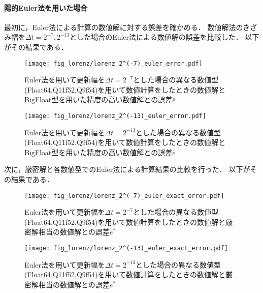 \paragraph*{陽的Euler法を用いた場合}
最初に，Euler法による計算の数値解に対する誤差を確かめる．
数値解法のきざみ幅を$\Delta t = 2^{-7},2^{-13}$とした場合のEuler法による数値解の誤差を比較した．
以下がその結果である．
\begin{figure}[H]
    \centering
    \begin{minipage}[b]{0.49\columnwidth}
        \centering
        \texttt{[image: fig\_lorenz/lorenz\_2^(-7)\_euler\_error.pdf]}
        \caption{Euler法を用いて更新幅を$\Delta t = 2^{-7}$とした場合の異なる数値型(Float64,Q11f52,Q9f54)を用いて数値計算をしたときの数値解とBigFloat型を用いた精度の高い数値解との誤差$\bar{e}$}
        \label{fig:lorenz_2^(-7)_euler_error}
    \end{minipage}
    \begin{minipage}[b]{0.49\columnwidth}
        \centering
        \texttt{[image: fig\_lorenz/lorenz\_2^(-13)\_euler\_error.pdf]}
        \caption{Euler法を用いて更新幅を$\Delta t =  2^{-13}$とした場合の異なる数値型(Float64,Q11f52,Q9f54)を用いて数値計算をしたときの数値解とBigFloat型を用いた精度の高い数値解との誤差$\bar{e}$}
        \label{fig:lorenz_2^(-13)_euler_error}
    \end{minipage}
\end{figure}
次に，厳密解と各数値型でのEuler法による計算結果の比較を行った．
以下がその結果である．
\begin{figure}[H]
    \centering
    \begin{minipage}[b]{0.49\columnwidth}
        \centering
        \texttt{[image: fig\_lorenz/lorenz\_2^(-7)\_euler\_exact\_error.pdf]}
        \caption{Euler法を用いて更新幅を$\Delta t = 2^{-7}$とした場合の異なる数値型(Float64,Q11f52,Q9f54)を用いて数値計算をしたときの数値解と厳密解相当の数値解との誤差$e^{\ast}$}
        \label{fig:lorenz_2^(-7)_euler_exact_error}
    \end{minipage}
    \begin{minipage}[b]{0.49\columnwidth}
        \centering
        \texttt{[image: fig\_lorenz/lorenz\_2^(-13)\_euler\_exact\_error.pdf]}
        \caption{Euler法を用いて更新幅を$\Delta t =  2^{-13}$とした場合の異なる数値型(Float64,Q11f52,Q9f54)を用いて数値計算をしたときの数値解と厳密解相当の数値解との誤差$e^{\ast}$}
        \label{fig:lorenz_2^(-13)_euler_exact_error}
    \end{minipage}
\end{figure}

